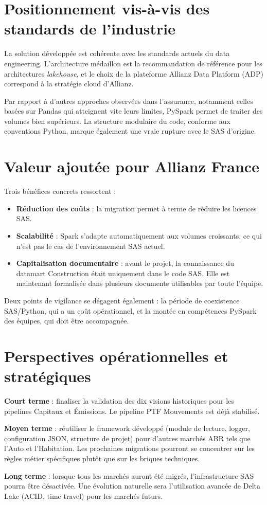 \section{Positionnement vis-à-vis des standards de l'industrie}

La solution développée est cohérente avec les standards actuels du data engineering. L'architecture médaillon est la recommandation de référence pour les architectures \textit{lakehouse}, et le choix de la plateforme Allianz Data Platform (ADP) correspond à la stratégie cloud d'Allianz.

Par rapport à d'autres approches observées dans l'assurance, notamment celles basées sur Pandas qui atteignent vite leurs limites, PySpark permet de traiter des volumes bien supérieurs. La structure modulaire du code, conforme aux conventions Python, marque également une vraie rupture avec le SAS d'origine.

\section{Valeur ajoutée pour Allianz France}

Trois bénéfices concrets ressortent :

\begin{itemize}
    \item \textbf{Réduction des coûts} : la migration permet à terme de réduire les licences SAS.
    \item \textbf{Scalabilité} : Spark s’adapte automatiquement aux volumes croissants, ce qui n’est pas le cas de l’environnement SAS actuel.
    \item \textbf{Capitalisation documentaire} : avant le projet, la connaissance du datamart Construction était uniquement dans le code SAS. Elle est maintenant formalisée dans plusieurs documents utilisables par toute l’équipe.
\end{itemize}

Deux points de vigilance se dégagent également : la période de coexistence SAS/Python, qui a un coût opérationnel, et la montée en compétences PySpark des équipes, qui doit être accompagnée.

\section{Perspectives opérationnelles et stratégiques}

\textbf{Court terme} : finaliser la validation des dix visions historiques pour les pipelines Capitaux et Émissions. Le pipeline PTF Mouvements est déjà stabilisé.

\textbf{Moyen terme} : réutiliser le framework développé (module de lecture, logger, configuration JSON, structure de projet) pour d'autres marchés ABR tels que l'Auto et l'Habitation. Les prochaines migrations pourront se concentrer sur les règles métier spécifiques plutôt que sur les briques techniques.

\textbf{Long terme} : lorsque tous les marchés auront été migrés, l’infrastructure SAS pourra être désactivée. Une évolution naturelle sera l’utilisation avancée de Delta Lake (ACID, time travel) pour les marchés futurs.
